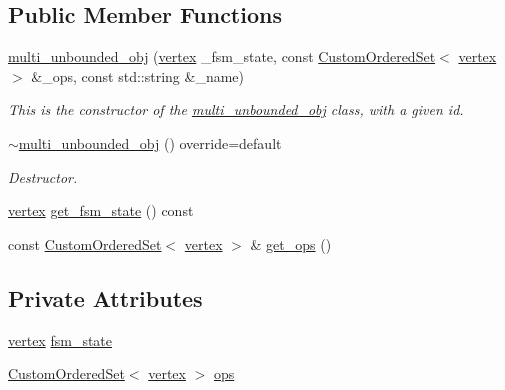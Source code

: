 \subsection*{Public Member Functions}
\begin{DoxyCompactItemize}
\item 
\hyperlink{classmulti__unbounded__obj_a38f08a84f08beb0c7d1860bd9bd29812}{multi\+\_\+unbounded\+\_\+obj} (\hyperlink{graph_8hpp_abefdcf0544e601805af44eca032cca14}{vertex} \+\_\+fsm\+\_\+state, const \hyperlink{classCustomOrderedSet}{Custom\+Ordered\+Set}$<$ \hyperlink{graph_8hpp_abefdcf0544e601805af44eca032cca14}{vertex} $>$ \&\+\_\+ops, const std\+::string \&\+\_\+name)
\begin{DoxyCompactList}\small\item\em This is the constructor of the \hyperlink{classmulti__unbounded__obj}{multi\+\_\+unbounded\+\_\+obj} class, with a given id. \end{DoxyCompactList}\item 
\hyperlink{classmulti__unbounded__obj_abedcaa36fbd515da531d18fb56206066}{$\sim$multi\+\_\+unbounded\+\_\+obj} () override=default
\begin{DoxyCompactList}\small\item\em Destructor. \end{DoxyCompactList}\item 
\hyperlink{graph_8hpp_abefdcf0544e601805af44eca032cca14}{vertex} \hyperlink{classmulti__unbounded__obj_a022fc9d3e50b0cbf81703dde3f30a4ae}{get\+\_\+fsm\+\_\+state} () const
\item 
const \hyperlink{classCustomOrderedSet}{Custom\+Ordered\+Set}$<$ \hyperlink{graph_8hpp_abefdcf0544e601805af44eca032cca14}{vertex} $>$ \& \hyperlink{classmulti__unbounded__obj_a53961b624ed6f3bf8e3e89787cad110c}{get\+\_\+ops} ()
\end{DoxyCompactItemize}
\subsection*{Private Attributes}
\begin{DoxyCompactItemize}
\item 
\hyperlink{graph_8hpp_abefdcf0544e601805af44eca032cca14}{vertex} \hyperlink{classmulti__unbounded__obj_a7cde2f620698f221171e6912d2ecae09}{fsm\+\_\+state}
\item 
\hyperlink{classCustomOrderedSet}{Custom\+Ordered\+Set}$<$ \hyperlink{graph_8hpp_abefdcf0544e601805af44eca032cca14}{vertex} $>$ \hyperlink{classmulti__unbounded__obj_aeef3ef0565db139f60e4f63abfc52780}{ops}
\end{DoxyCompactItemize}
